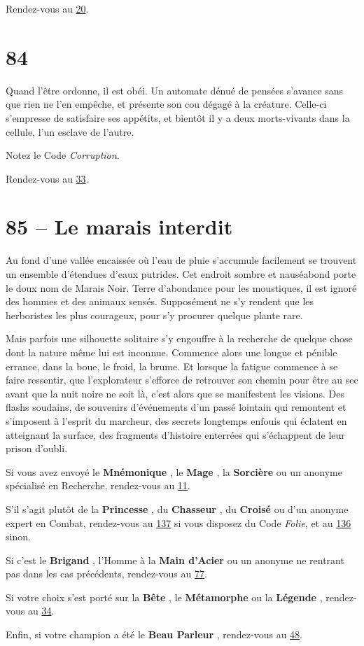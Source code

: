 \documentclass{report}
\newcommand{\gsection}[1]{
    \section{#1}
    \label{section-#1}
}
\newcommand{\glink}[1]{\hyperref[section-#1]{#1}}
\newcommand{\hero}[1]{
    \textbf{#1}
}
\begin{document}
Rendez-vous au \glink{20}.

\gsection{84}

Quand l'être ordonne, il est obéi. Un automate dénué de pensées s'avance sans que rien ne l'en empêche, et présente son cou dégagé à la créature. Celle-ci s'empresse de satisfaire ses appétits, et bientôt il y a deux morts-vivants dans la cellule, l'un esclave de l'autre.

Notez le Code \emph{Corruption}.

Rendez-vous au \glink{33}.

\gsection{85 – Le marais interdit}

Au fond d'une vallée encaissée où l'eau de pluie s'accumule facilement se trouvent un ensemble d'étendues d'eaux putrides. Cet endroit sombre et nauséabond porte le doux nom de Marais Noir. Terre d'abondance pour les moustiques, il est ignoré des hommes et des animaux sensés. Supposément ne s'y rendent que les herboristes les plus courageux, pour s'y procurer quelque plante rare.

Mais parfois une silhouette solitaire s'y engouffre à la recherche de quelque chose dont la nature même lui est inconnue. Commence alors une longue et pénible errance, dans la boue, le froid, la brume. Et lorsque la fatigue commence à se faire ressentir, que l'explorateur s'efforce de retrouver son chemin pour être au sec avant que la nuit noire ne soit là, c'est alors que se manifestent les visions. Des flashs soudains, de souvenirs d'événements d'un passé lointain qui remontent et s'imposent à l'esprit du marcheur, des secrets longtemps enfouis qui éclatent en atteignant la surface, des fragments d'histoire enterrées qui s'échappent de leur prison d'oubli.

Si vous avez envoyé le \hero{Mnémonique}, le \hero{Mage}, la \hero{Sorcière} ou un anonyme spécialisé en Recherche, rendez-vous au \glink{11}.

S'il s'agit plutôt de la \hero{Princesse}, du \hero{Chasseur}, du \hero{Croisé} ou d'un anonyme expert en Combat, rendez-vous au \glink{137} si vous disposez du Code \emph{Folie}, et au \glink{136} sinon.

Si c'est le \hero{Brigand}, l'Homme à la \hero{Main d'Acier} ou un anonyme ne rentrant pas dans les cas précédents, rendez-vous au \glink{77}.

Si votre choix s'est porté sur la \hero{Bête}, le \hero{Métamorphe} ou la \hero{Légende}, rendez-vous au \glink{34}.

Enfin, si votre champion a été le \hero{Beau Parleur}, rendez-vous au \glink{48}.
\end{document}
